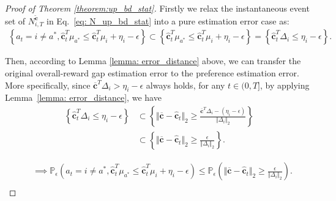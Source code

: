 \begin{proof}[Proof of Theorem \ref{theorem:up_bd_stat}]
Firstly we relax the instantaneous event set of $N_{i,T}^{\widetilde{\boldsymbol{c}}}$ in Eq.~\ref{eq: N_up_bd_stat} into a pure estimation error case as:
\begin{equation}
\begin{aligned}
\left\{ a_t = i \neq a^*, \hat{\boldsymbol{c}}_{t}^{T} \mu_{a^{*}} \leq \hat{\boldsymbol{c}}_{t}^{T} \mu_{i} + \eta_i - \epsilon \right\}
\subset
\left\{\hat{\boldsymbol{c}}_{t}^{T} \mu_{a^{*}} \leq \hat{\boldsymbol{c}}_{t}^{T} \mu_{i} + \eta_{i} - \epsilon \right\}
= 
\left\{\hat{\boldsymbol{c}}_{t}^{T} \Delta_{i} \leq \eta_{i} - \epsilon \right\}.
\end{aligned}
\end{equation}

Then, according to Lemma \ref{lemma: error_distance} above, we can transfer the original overall-reward gap estimation error to the preference estimation error.
More specifically, since ${\boldsymbol{\overline{c}}^T \Delta_{i} > \eta_{i} - \epsilon }$ always holds, for any $t \in (0, T]$, by applying Lemma~\ref{lemma: error_distance}, we have 
\begin{equation}
\begin{aligned}
\label{eq: term_2_set_stat}
\left\{\hat{\boldsymbol{c}}_{t}^{T} \Delta_{i} \leq \eta_{i} - \epsilon \right\} 
& \subset
\left\{ \Vert \overline{\boldsymbol{c}} - \hat{\boldsymbol{c}}_t \Vert_2 \geq \frac{\overline{\boldsymbol{c}}^{T} \Delta_{i} - ( \eta_{i} - \epsilon ) }{ \Vert \Delta_{i} \Vert_2 } \right\} \\
& \subset
\left\{ \Vert \overline{\boldsymbol{c}} - \hat{\boldsymbol{c}}_t \Vert_2 
\geq
\frac{ \epsilon }{ \Vert \Delta_{i} \Vert_2 } \right\}.
\end{aligned}
\end{equation}

\begin{equation}
\begin{aligned}
\label{eq: term_2_set_prob_stat}
& \implies
\mathbb{P}_{\epsilon} \left( a_t = i \neq a^*, \hat{\boldsymbol{c}}_{t}^{T} \mu_{a^{*}} \leq \hat{\boldsymbol{c}}_{t}^{T} \mu_{i} + \eta_i - \epsilon \right)
\leq
\mathbb{P}_{\epsilon} \left( \Vert \overline{\boldsymbol{c}} - \hat{\boldsymbol{c}}_t \Vert_2 \geq \frac{\epsilon}{ \Vert \Delta_{i} \Vert_2 } \right). \\
\end{aligned}
\end{equation}


\end{proof}

